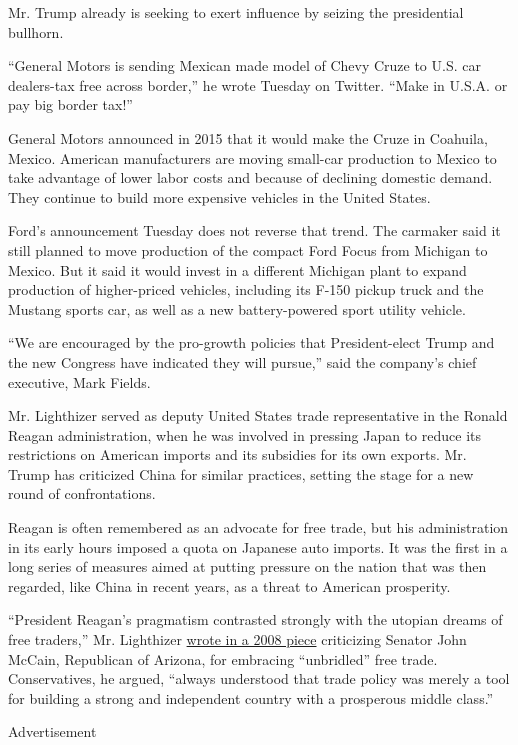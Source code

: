 Mr. Trump already is seeking to exert influence by seizing the
presidential bullhorn.

``General Motors is sending Mexican made model of Chevy Cruze to U.S.
car dealers-tax free across border,'' he wrote Tuesday on Twitter.
``Make in U.S.A. or pay big border tax!''

General Motors announced in 2015 that it would make the Cruze in
Coahuila, Mexico. American manufacturers are moving small-car production
to Mexico to take advantage of lower labor costs and because of
declining domestic demand. They continue to build more expensive
vehicles in the United States.

Ford's announcement Tuesday does not reverse that trend. The carmaker
said it still planned to move production of the compact Ford Focus from
Michigan to Mexico. But it said it would invest in a different Michigan
plant to expand production of higher-priced vehicles, including its
F-150 pickup truck and the Mustang sports car, as well as a new
battery-powered sport utility vehicle.

``We are encouraged by the pro-growth policies that President-elect
Trump and the new Congress have indicated they will pursue,'' said the
company's chief executive, Mark Fields.

Mr. Lighthizer served as deputy United States trade representative in
the Ronald Reagan administration, when he was involved in pressing Japan
to reduce its restrictions on American imports and its subsidies for its
own exports. Mr. Trump has criticized China for similar practices,
setting the stage for a new round of confrontations.

Reagan is often remembered as an advocate for free trade, but his
administration in its early hours imposed a quota on Japanese auto
imports. It was the first in a long series of measures aimed at putting
pressure on the nation that was then regarded, like China in recent
years, as a threat to American prosperity.

``President Reagan's pragmatism contrasted strongly with the utopian
dreams of free traders,'' Mr. Lighthizer
\href{http://www.nytimes3xbfgragh.onion/2008/03/06/opinion/06lighthizer.html}{wrote
in a 2008 piece} criticizing Senator John McCain, Republican of Arizona,
for embracing ``unbridled'' free trade. Conservatives, he argued,
``always understood that trade policy was merely a tool for building a
strong and independent country with a prosperous middle class.''

Advertisement

